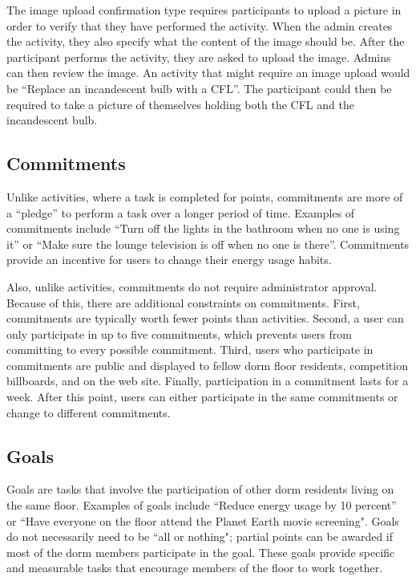 The image upload confirmation type requires participants to upload a picture in order to verify that they have performed the activity.  When the admin creates the activity, they also specify what the content of the image should be.  After the participant performs the activity, they are asked to upload the image.  Admins can then review the image.  An activity that might require an image upload would be ``Replace an incandescent bulb with a CFL''.  The participant could then be required to take a picture of themselves holding both the CFL and the incandescent bulb.

\subsection{Commitments}

Unlike activities, where a task is completed for points, commitments are more of a ``pledge'' to perform a task over a longer period of time.  Examples of commitments include ``Turn off the lights in the bathroom when no one is using it'' or ``Make sure the lounge television is off when no one is there''.  Commitments provide an incentive for users to change their energy usage habits.

Also, unlike activities, commitments do not require administrator approval.  Because of this, there are additional constraints on commitments.  First, commitments are typically worth fewer points than activities.  Second, a user can only participate in up to five commitments, which prevents users from committing to every possible commitment.  Third, users who participate in commitments are public and displayed to fellow dorm floor residents, competition billboards, and on the web site.  Finally, participation in a commitment lasts for a week.  After this point, users can either participate in the same commitments or change to different commitments.

\subsection{Goals}

Goals are tasks that involve the participation of other dorm residents living on the same floor.  Examples of goals include ``Reduce energy usage by 10 percent'' or ``Have everyone on the floor attend the Planet Earth movie screening".  Goals do not necessarily need to be ``all or nothing"; partial points can be awarded if most of the dorm members participate in the goal.  These goals provide specific and measurable tasks that encourage members of the floor to work together.

